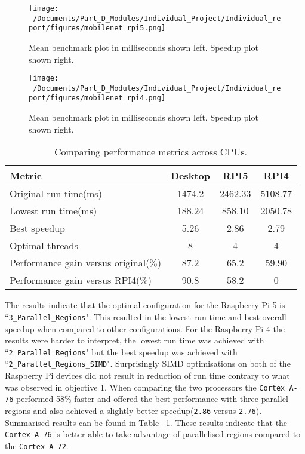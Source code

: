 \begin{figure}[htbp] %
	\centering
	\texttt{[image: ~/Documents/Part\_D\_Modules/Individual\_Project/Individual\_report/figures/mobilenet\_rpi5.png]} %
	\caption{Mean benchmark plot in milliseconds shown left. Speedup plot shown right.}
	\label{fig:mobilenet_rpi5_plot} %
\end{figure}

\begin{figure}[htbp] %
	\centering
	\texttt{[image: ~/Documents/Part\_D\_Modules/Individual\_Project/Individual\_report/figures/mobilenet\_rpi4.png]} %
	\caption{Mean benchmark plot in milliseconds shown left. Speedup plot shown right.}
	\label{fig:mobilenet_rpi4_plot} %
\end{figure}

\begin{table}[htbp]
	\centering
	\begin{tabular}{@{}lccc@{}}
		\toprule
		\textbf{Metric} & \textbf{Desktop} & \textbf{RPI5} & \textbf{RPI4} \\ \midrule
		Original run time(ms)&1474.2&2462.33 &5108.77 \\ \hline
		Lowest run time(ms)&188.24 &858.10 &2050.78 \\ \hline
		Best speedup&5.26 &2.86 &2.79 \\ \hline
		Optimal threads&8 &4 & 4\\ \hline
		Performance gain versus original(\%)&87.2&65.2 & 59.90\\ \hline
		Performance gain versus RPI4(\%)&90.8 &58.2 &0 \\
		\bottomrule
	\end{tabular}
	\caption{Comparing performance metrics across CPUs.}
	\label{tab:performance_comparison}
\end{table}

The results indicate that the optimal configuration for the Raspberry Pi 5 is ``\texttt{3\_Parallel\_Regions}". This resulted in the lowest run time and best overall speedup when compared to other configurations. For the Raspberry Pi 4 the results were harder to interpret, the lowest run time was achieved with ``\texttt{2\_Parallel\_Regions}" but the best speedup was achieved with ``\texttt{2\_Parallel\_Regions\_SIMD}". Surprisingly SIMD optimisations on both of the Raspberry Pi devices did not result in reduction of run time contrary to what was observed in objective 1. When comparing the two processors the \texttt{Cortex A-76} performed 58\% faster and offered the best performance with three parallel regions and also achieved a slightly better speedup(\texttt{2.86} versus \texttt{2.76}). Summarised results can be found in Table ~\ref{tab:performance_comparison}. These results indicate that the \texttt{Cortex A-76} is better able to take advantage of parallelised regions compared to the \texttt{Cortex A-72}.  

